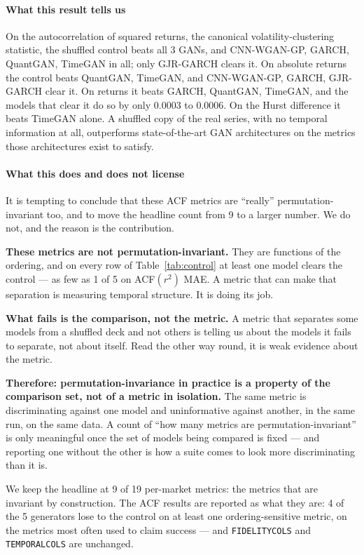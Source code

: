\documentclass[11pt,a4paper]{article}
\makeatletter
\DeclareRobustCommand{\_}{\ifmmode\nfss@text{\textunderscore}\else\textunderscore\allowbreak\fi}
\makeatother
\begin{document}
\paragraph{What this result tells us} On the autocorrelation of squared returns, the canonical volatility-clustering statistic, the shuffled control beats all 3 GANs, and CNN-WGAN-GP, GARCH, QuantGAN, TimeGAN in all; only GJR-GARCH clears it. On absolute returns the control beats QuantGAN, TimeGAN, and CNN-WGAN-GP, GARCH, GJR-GARCH clear it. On returns it beats GARCH, QuantGAN, TimeGAN, and the models that clear it do so by only 0.0003 to 0.0006. On the Hurst difference it beats TimeGAN alone. A shuffled copy of the real series, with no temporal information at all, outperforms state-of-the-art GAN architectures on the metrics those architectures exist to satisfy.

\paragraph{What this does and does not license} It is tempting to conclude that these ACF metrics are ``really'' permutation-invariant too, and to move the headline count from 9 to a larger number. We do not, and the reason is the contribution.

\textbf{These metrics are not permutation-invariant.} They are functions of the ordering, and on every row of Table~\ref{tab:control} at least one model clears the control --- as few as 1 of 5 on ACF$(r^2)$ MAE. A metric that can make that separation is measuring temporal structure. It is doing its job.

\textbf{What fails is the comparison, not the metric.} A metric that separates some models from a shuffled deck and not others is telling us about the models it fails to separate, not about itself. Read the other way round, it is weak evidence about the metric.

\textbf{Therefore: permutation-invariance in practice is a property of the comparison set, not of a metric in isolation.} The same metric is discriminating against one model and uninformative against another, in the same run, on the same data. A count of ``how many metrics are permutation-invariant'' is only meaningful once the set of models being compared is fixed --- and reporting one without the other is how a suite comes to look more discriminating than it is.

We keep the headline at 9 of 19 per-market metrics: the metrics that are invariant by construction. The ACF results are reported as what they are: 4 of the 5 generators lose to the control on at least one ordering-sensitive metric, on the metrics most often used to claim success --- and \texttt{FIDELITY\_COLS} and \texttt{TEMPORAL\_COLS} are unchanged.
\end{document}
